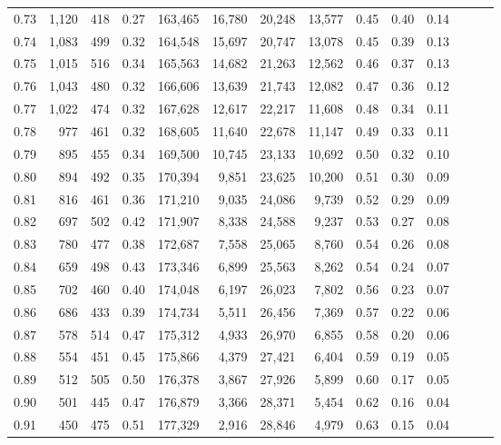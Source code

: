 \begin{tabular}{rrrrrrrrrrrrrr}
0.73 &  1,120 &    418 &  0.27 &  163,465 &   16,780 &  20,248 &  13,577 &  0.45 &  0.40 &      0.14 \\
0.74 &  1,083 &    499 &  0.32 &  164,548 &   15,697 &  20,747 &  13,078 &  0.45 &  0.39 &      0.13 \\
0.75 &  1,015 &    516 &  0.34 &  165,563 &   14,682 &  21,263 &  12,562 &  0.46 &  0.37 &      0.13 \\
0.76 &  1,043 &    480 &  0.32 &  166,606 &   13,639 &  21,743 &  12,082 &  0.47 &  0.36 &      0.12 \\
0.77 &  1,022 &    474 &  0.32 &  167,628 &   12,617 &  22,217 &  11,608 &  0.48 &  0.34 &      0.11 \\
0.78 &    977 &    461 &  0.32 &  168,605 &   11,640 &  22,678 &  11,147 &  0.49 &  0.33 &      0.11 \\
0.79 &    895 &    455 &  0.34 &  169,500 &   10,745 &  23,133 &  10,692 &  0.50 &  0.32 &      0.10 \\
0.80 &    894 &    492 &  0.35 &  170,394 &    9,851 &  23,625 &  10,200 &  0.51 &  0.30 &      0.09 \\
0.81 &    816 &    461 &  0.36 &  171,210 &    9,035 &  24,086 &   9,739 &  0.52 &  0.29 &      0.09 \\
0.82 &    697 &    502 &  0.42 &  171,907 &    8,338 &  24,588 &   9,237 &  0.53 &  0.27 &      0.08 \\
0.83 &    780 &    477 &  0.38 &  172,687 &    7,558 &  25,065 &   8,760 &  0.54 &  0.26 &      0.08 \\
0.84 &    659 &    498 &  0.43 &  173,346 &    6,899 &  25,563 &   8,262 &  0.54 &  0.24 &      0.07 \\
0.85 &    702 &    460 &  0.40 &  174,048 &    6,197 &  26,023 &   7,802 &  0.56 &  0.23 &      0.07 \\
0.86 &    686 &    433 &  0.39 &  174,734 &    5,511 &  26,456 &   7,369 &  0.57 &  0.22 &      0.06 \\
0.87 &    578 &    514 &  0.47 &  175,312 &    4,933 &  26,970 &   6,855 &  0.58 &  0.20 &      0.06 \\
0.88 &    554 &    451 &  0.45 &  175,866 &    4,379 &  27,421 &   6,404 &  0.59 &  0.19 &      0.05 \\
0.89 &    512 &    505 &  0.50 &  176,378 &    3,867 &  27,926 &   5,899 &  0.60 &  0.17 &      0.05 \\
0.90 &    501 &    445 &  0.47 &  176,879 &    3,366 &  28,371 &   5,454 &  0.62 &  0.16 &      0.04 \\
0.91 &    450 &    475 &  0.51 &  177,329 &    2,916 &  28,846 &   4,979 &  0.63 &  0.15 &      0.04 \\

\end{tabular}
